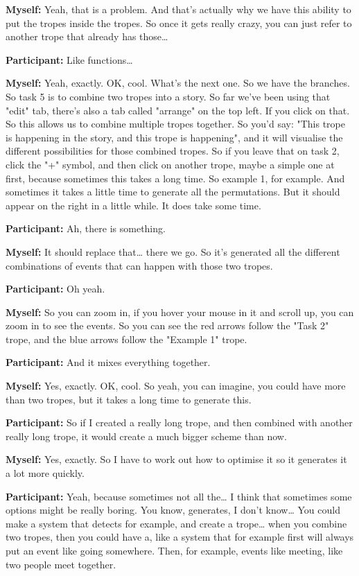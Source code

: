 \documentclass[11pt]{report}
\newcommand{\llabel}[1]{\hypertarget{llineno:#1}{\linelabel{#1}}}
\begin{document}
\begin{linenumbers}
\textbf{Myself:} Yeah, that is a problem. And that's actually why we have this ability to put the tropes inside the tropes. So once it gets really crazy, you can just refer to another trope that already has those\ldots{}\llabel{lne:use3f}

\textbf{Participant:} Like functions\ldots{}

\textbf{Myself:} Yeah, exactly. OK, cool. What's the next one. So we have the branches. So task 5 is to combine two tropes into a story. So far we've been using that "edit" tab, there's also a tab called "arrange" on the top left. If you click on that. So this allows us to combine multiple tropes together. So you'd say: "This trope is happening in the story, and this trope is happening", and it will visualise the different possibilities for those combined tropes. So if you leave that on task 2, click the "+" symbol, and then click on another trope, maybe a simple one at first, because sometimes this takes a long time. So example 1, for example. And sometimes it takes a little time to generate all the permutations. But it should appear on the right in a little while. It does take some time.

\textbf{Participant:} Ah, there is something.

\textbf{Myself:} It should replace that\ldots{} there we go. So it's generated all the different combinations of events that can happen with those two tropes.

\textbf{Participant:} Oh yeah.

\textbf{Myself:} So you can zoom in, if you hover your mouse in it and scroll up, you can zoom in to see the events. So you can see the red arrows follow the "Task 2" trope, and the blue arrows follow the "Example 1" trope.

\textbf{Participant:} And it mixes everything together.

\textbf{Myself:} Yes, exactly. OK, cool. So yeah, you can imagine, you could have more than two tropes, but it takes a long time to generate this.

\textbf{Participant:} So if I created a really long trope, and then combined with another really long trope, it would create a much bigger scheme than now.

\textbf{Myself:} Yes, exactly. So I have to work out how to optimise it so it generates it a lot more quickly.

\textbf{Participant:} Yeah, because sometimes not all the\ldots{} I think that sometimes some options might be really boring. You know, generates, I don't know\ldots{} You could make a system that detects for example, and create a trope\ldots{} when you combine two tropes, then you could have a, like a system that for example first will always put an event like going somewhere. Then, for example, events like meeting, like two people meet together.


\end{linenumbers}
\end{document}
